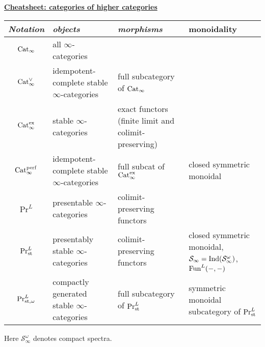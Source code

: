 \begin{mdframed}[style=cheatsheet]
\begin{center}

\underline{\textbf{Cheatsheet: categories of higher categories}}
    \small
        \begin{tabular}{| c || p{3cm} | p{3cm}| p{3cm} |}
        \hline
        \textit{Notation} & \textit{objects} & \textit{morphisms} & monoidality \\
        \hline\hline
        $\mathrm{Cat}_\infty$ & all $\infty$-categories & & \\
        \hline
        $\mathrm{Cat}_\infty^\vee$ & idempotent-complete stable $\infty$-categories & full subcategory of $\mathrm{Cat}_\infty$ & \\
        \hline
        $\mathrm{Cat}_\infty^\text{ex}$ & stable $\infty$-categories & exact functors (finite limit and colimit-preserving) & \\
        \hline
        $\mathrm{Cat}_\infty^{\mathrm{perf}}$ & idempotent-complete stable $\infty$-categories & full subcat of $\mathrm{Cat}_\infty^\text{ex}$ & closed symmetric monoidal\\
        \hline
        $\Pr^L$ & presentable $\infty$-categories & colimit-preserving functors & \\
        \hline
        $\mathrm{Pr}^L_{\mathrm{st}}$ & presentably stable $\infty$-categories & colimit-preserving functors & closed symmetric monoidal, $\mathcal{S}_\infty = \mathrm{Ind}(\mathcal{S}_\infty^\omega)$, $\mathrm{Fun}^L(-,-)$\\
        \hline
        $\mathrm{Pr}^L_{\mathrm{st},\omega}$ & compactly generated stable $\infty$-categories & full subcategory of $\mathrm{Pr}^L_{\mathrm{st}}$ & symmetric monoidal subcategory of $\mathrm{Pr}^L_{\mathrm{st}}$\\
        \hline
        \end{tabular}
\end{center}
Here $\mathcal{S}_\infty^\omega$ denotes compact spectra.
\end{mdframed}
